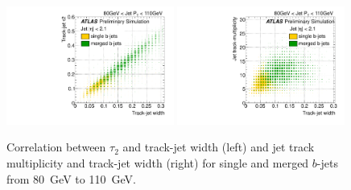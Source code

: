 
\begin{figure}[tp]
\centering
\includegraphics[width=0.49\textwidth]{FIGS/VarsSingleMerged/Tau2trkWidth080.pdf}
\includegraphics[width=0.49\textwidth]{FIGS/VarsSingleMerged/NtrktrkWidth080.pdf}
\caption{Correlation between $\tau _2$ and track-jet width (left) and jet track multiplicity and track-jet width (right) for single and merged $b$-jets from 80~GeV to 110~GeV. }
\label{fig:tau2trkwidthsinglemerged}
\end{figure}

